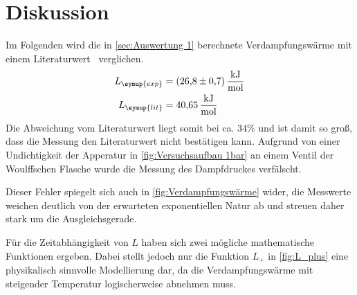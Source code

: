 \section{Diskussion}
\label{sec:Diskussion}

Im Folgenden wird die in \ref{sec:Auswertung 1} berechnete Verdampfungswärme mit einem Literaturwert~\cite{czichos} verglichen.
\begin{align}
    L_{\symup{exp}}&=\qty{26,8+-0,7}{\kilo\joule\per\mol} \notag \\ 
    L_{\symup{lit}}&=\qty{40,65}{\kilo\joule\per\mol} \notag
\end{align}
Die Abweichung vom Literaturwert liegt somit bei ca. $34\%$ und ist damit so groß, dass die Messung den
Literaturwert nicht bestätigen kann.
Aufgrund von einer Undichtigkeit der Apperatur in \autoref{fig:Versuchsaufbau 1bar} an einem Ventil
der Woulffschen Flasche wurde die Messung des Dampfdruckes verfälscht.

Dieser Fehler spiegelt sich auch in \autoref{fig:Verdampfungswärme} wider, die Messwerte weichen deutlich
von der erwarteten exponentiellen Natur ab und streuen daher stark um die Ausgleichsgerade.

Für die Zeitabhängigkeit von $L$ haben sich zwei mögliche mathematische Funktionen ergeben.
Dabei stellt jedoch nur die Funktion $L_{+}$ in \autoref{fig:L_plus} eine physikalisch sinnvolle
Modellierung dar, da die Verdampfungswärme mit steigender Temperatur logischerweise abnehmen muss.
